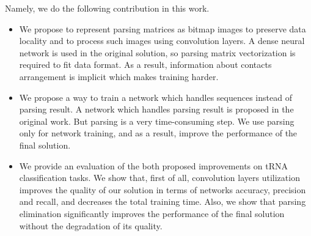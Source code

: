 Namely, we do the following contribution in this work.
\begin{itemize}
\item We propose to represent parsing matrices as bitmap images to preserve data locality and to process such images using convolution layers. 
A dense neural network is used in the original solution, so parsing matrix vectorization is required to fit data format. 
As a result, information about contacts arrangement is implicit which makes training harder.
\item  We propose a way to train a network which handles sequences instead of parsing result.
A network which handles parsing result is proposed in the original work. But parsing is a very time-consuming step. 
We use parsing only for network training, and as a result, improve the performance of the final solution.
\item We provide an evaluation of the both proposed improvements on tRNA classification tasks. 
We show that, first of all, convolution layers utilization improves the quality of our solution in terms of networks accuracy, precision and recall, and decreases the total training time.
Also, we show that parsing elimination significantly improves the performance of the final solution without the degradation of its quality.
\end{itemize}